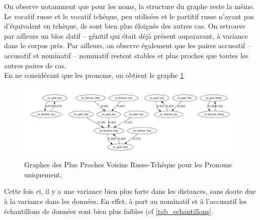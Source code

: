\documentclass{cours}
\begin{document}
On observe notamment que pour les noms, la structure du graphe reste la même.
Le vocatif russe et le vocatif tchèque, peu utilisées et le partitif russe n'ayant pas d'équivalent en tchèque, ils sont bien plus éloignés des autres cas.
On retrouve par ailleurs un bloc datif -- génitif qui était déjà présent auparavant, à variance dans le corpus près.
Par ailleurs, on observe également que les paires accusatif -- accusatif et nominatif -- nominatif restent stables et plus proches que toutes les autres paires de cas.\\
En ne considérant que les pronoms, on obtient le graphe \ref{fig_gnn_pronouns_ru_cz}

\begin{figure}
	\centering
	\includegraphics[width=\textwidth]{Figures/GNN/gnn_ru_gsd_cs_fictree_Pronouns_Only}
	\caption{Graphes des Plus Proches Voisins Russe-Tchèque pour les Pronoms uniquement.}
	\label{fig_gnn_pronouns_ru_cz}
\end{figure}

Cette fois ci, il y a une variance bien plus forte dans les distances, sans doute due à la variance dans les données. En effet, à part au nominatif et à l'accusatif les échantillons de données sont bien plus faibles (cf \ref{tab_echantillons}.
\end{document}

